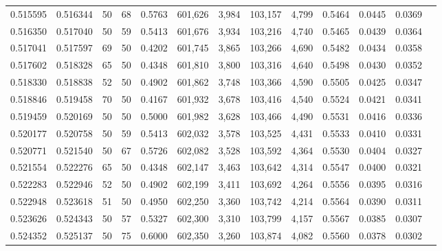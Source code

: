 \begin{tabular}{rrrrrrrrrrrrr}
0.515595 & 0.516344 &    50 &  68 &                                     0.5763 & 601,626 &   3,984 & 103,157 &   4,799 & 0.5464 & 0.0445 & 0.0369 \\
0.516350 & 0.517040 &    50 &  59 &                                     0.5413 & 601,676 &   3,934 & 103,216 &   4,740 & 0.5465 & 0.0439 & 0.0364 \\
0.517041 & 0.517597 &    69 &  50 &                                     0.4202 & 601,745 &   3,865 & 103,266 &   4,690 & 0.5482 & 0.0434 & 0.0358 \\
0.517602 & 0.518328 &    65 &  50 &                                     0.4348 & 601,810 &   3,800 & 103,316 &   4,640 & 0.5498 & 0.0430 & 0.0352 \\
0.518330 & 0.518838 &    52 &  50 &                                     0.4902 & 601,862 &   3,748 & 103,366 &   4,590 & 0.5505 & 0.0425 & 0.0347 \\
0.518846 & 0.519458 &    70 &  50 &                                     0.4167 & 601,932 &   3,678 & 103,416 &   4,540 & 0.5524 & 0.0421 & 0.0341 \\
0.519459 & 0.520169 &    50 &  50 &                                     0.5000 & 601,982 &   3,628 & 103,466 &   4,490 & 0.5531 & 0.0416 & 0.0336 \\
0.520177 & 0.520758 &    50 &  59 &                                     0.5413 & 602,032 &   3,578 & 103,525 &   4,431 & 0.5533 & 0.0410 & 0.0331 \\
0.520771 & 0.521540 &    50 &  67 &                                     0.5726 & 602,082 &   3,528 & 103,592 &   4,364 & 0.5530 & 0.0404 & 0.0327 \\
0.521554 & 0.522276 &    65 &  50 &                                     0.4348 & 602,147 &   3,463 & 103,642 &   4,314 & 0.5547 & 0.0400 & 0.0321 \\
0.522283 & 0.522946 &    52 &  50 &                                     0.4902 & 602,199 &   3,411 & 103,692 &   4,264 & 0.5556 & 0.0395 & 0.0316 \\
0.522948 & 0.523618 &    51 &  50 &                                     0.4950 & 602,250 &   3,360 & 103,742 &   4,214 & 0.5564 & 0.0390 & 0.0311 \\
0.523626 & 0.524343 &    50 &  57 &                                     0.5327 & 602,300 &   3,310 & 103,799 &   4,157 & 0.5567 & 0.0385 & 0.0307 \\
0.524352 & 0.525137 &    50 &  75 &                                     0.6000 & 602,350 &   3,260 & 103,874 &   4,082 & 0.5560 & 0.0378 & 0.0302 \\

\end{tabular}
